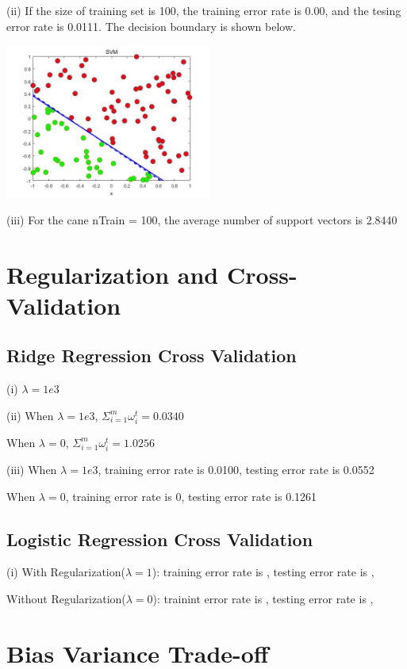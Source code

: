 \documentclass[11pt]{article} %
\begin{document}
(ii) If the size of training set is 100, the training error rate is 0.00, and the tesing error rate is 0.0111. The decision boundary is shown below.

\begin{center}
\includegraphics[height=2in]{./SVM_ii.jpg}
\end{center} 

(iii) For the cane nTrain = 100, the average number of support vectors is 2.8440




\section{Regularization and Cross-Validation}
\subsection{Ridge Regression Cross Validation}

(i) $ \lambda = 1e3$

(ii) When $ \lambda = 1e3 $, $\Sigma_{i=1}^{m} \omega_{i}^{t} = 0.0340$

When $ \lambda = 0 $, $\Sigma_{i=1}^{m} \omega_{i}^{t} = 1.0256$

(iii) When $\lambda=1e3$, training error rate is 0.0100, testing error rate is 0.0552

When $\lambda=0$, training error rate is 0, testing error rate is 0.1261

\subsection{Logistic Regression Cross Validation}

(i) 
With Regularization($\lambda=1$):
training error rate is , 
testing error rate is ,

Without Regularization($\lambda=0$):
trainint error rate is ,
testing error rate is ,

\section{Bias Variance Trade-off}
\end{document}

